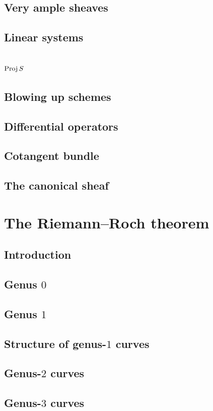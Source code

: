 \documentclass [11 pt, oneside, margin = 1 in] {article}
\begin{document}
\subsection{Very ample sheaves}
\subsection{Linear systems}
\subsection{$\operatorname{Proj} S$}
\subsection{Blowing up schemes}
\subsection{Differential operators}
\subsection{Cotangent bundle}
\subsection{The canonical sheaf}


\section{The Riemann--Roch theorem}
\subsection{Introduction}
\subsection{Genus $0$}
\subsection{Genus $1$}
\subsection{Structure of genus-$1$ curves}
\subsection{Genus-$2$ curves}
\subsection{Genus-$3$ curves}
\end{document}
